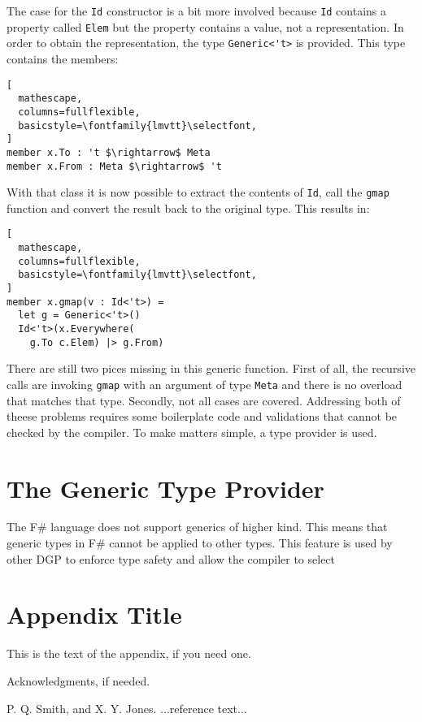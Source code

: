 \documentclass{sigplanconf}
\begin{document}
The case for the \verb+Id+ constructor is a bit more involved because \verb+Id+ contains a property called \verb+Elem+ but the property contains a value, not a representation. In order to obtain the representation, the type \verb+Generic<'t>+ is provided. This type contains the members:
\begin{lstlisting}[
  mathescape,
  columns=fullflexible,
  basicstyle=\fontfamily{lmvtt}\selectfont,
]
member x.To : 't $\rightarrow$ Meta
member x.From : Meta $\rightarrow$ 't
\end{lstlisting}
With that class it is now possible to extract the contents of \verb+Id+, call the \verb+gmap+ function and convert the result back to the original type. This results in:
\begin{lstlisting}[
  mathescape,
  columns=fullflexible,
  basicstyle=\fontfamily{lmvtt}\selectfont,
]
member x.gmap(v : Id<'t>) =
  let g = Generic<'t>()
  Id<'t>(x.Everywhere(
    g.To c.Elem) |> g.From)
\end{lstlisting}
There are still two pices missing in this generic function. First of all, the recursive calls are invoking \verb+gmap+ with an argument of type \verb+Meta+ and there is no overload that matches that type. Secondly, not all cases are covered. Addressing both of theese problems requires some boilerplate code and validations that cannot be checked by the compiler. To make matters simple, a type provider is used.
\section{The Generic Type Provider}
The F\# language does not support generics of higher kind. This means that generic types in F\# cannot be applied to other types. This feature is used by other DGP \cite{Regular,MultiRec,GenericDeriving,RepLib} to enforce type safety and allow the compiler to select  

\appendix
\section{Appendix Title}

This is the text of the appendix, if you need one.

\acks

Acknowledgments, if needed.





\begin{thebibliography}{}
\softraggedright

P. Q. Smith, and X. Y. Jones. ...reference text...

\end{thebibliography}
\end{document}
